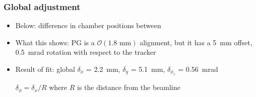 \documentclass[compress]{beamer}
\begin{document}
\begin{frame}
\frametitle{Global adjustment}
\begin{itemize}
\item Below: difference in chamber positions between


\item<1-2> What this shows: PG is a $\mathcal{O}(\mbox{1.8 mm})$ alignment,
  but it has a 5~mm offset, 0.5~mrad rotation with respect to the
  tracker

\item<2> Result of fit: global $\delta_x$ = 2.2~mm, $\delta_y$ = 5.1~mm, $\delta_{\phi_z}$ = 0.56~mrad

$\delta_\phi = \delta_x / R$ where $R$ is the distance from the beamline
\end{itemize}


\end{frame}
\end{document}
